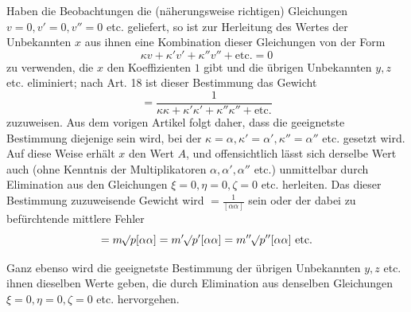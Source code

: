 Haben die Beobachtungen die (näherungsweise richtigen) Gleichungen \(v=0,v'=0,v''=0\) etc. geliefert, so ist zur Herleitung des Wertes der Unbekannten \(x\) aus ihnen eine Kombination dieser Gleichungen von der Form
\[
\kappa v+\kappa'v'+\kappa''v''+\text{etc.}=0
\]
zu verwenden, die \(x\) den Koeffizienten \(1\) gibt und die übrigen Unbekannten \(y,z\) etc. eliminiert; nach Art. 18 ist dieser Bestimmung das Gewicht
\[
=\frac1{\kappa\kappa+\kappa'\kappa'+\kappa''\kappa''+\text{etc.}}
\]
zuzuweisen. Aus dem vorigen Artikel folgt daher, dass die geeignetste Bestimmung diejenige sein wird, bei der \(\kappa=\alpha,\kappa'=\alpha',\kappa''=\alpha''\) etc. gesetzt wird. Auf diese Weise erhält \(x\) den Wert \(A\), und offensichtlich lässt sich derselbe Wert auch (ohne Kenntnis der Multiplikatoren \(\alpha,\alpha',\alpha''\) etc.) unmittelbar durch Elimination aus den Gleichungen \(\xi=0,\eta=0,\zeta=0\) etc. herleiten. Das dieser Bestimmung zuzuweisende Gewicht wird \(=\frac1{[\alpha\alpha]}\) sein oder der dabei zu befürchtende mittlere Fehler
\[
=m\mathord{{}^{}\!\surd}p[\alpha\alpha]=m'\mathord{{}^{}\!\surd}p'[\alpha\alpha]=m''\mathord{{}^{}\!\surd}p''[\alpha\alpha]\text{ etc.}
\]

Ganz ebenso wird die geeignetste Bestimmung der übrigen Unbekannten \(y,z\) etc. ihnen dieselben Werte geben, die durch Elimination aus denselben Gleichungen \(\xi=0,\eta=0,\zeta=0\) etc. hervorgehen.

